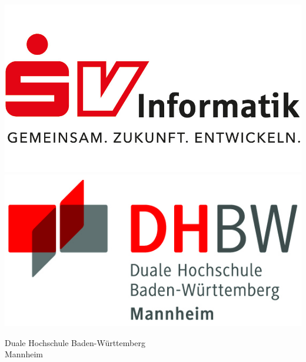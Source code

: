 \begin{titlepage}
	\begin{minipage}{\textwidth}
		\vspace{-2cm}
		\noindent \includegraphics[scale=0.71]{resource/SV-Inforamtik-Logo.jpg} \hfill   \includegraphics{resource/DHBW-Logo.jpg}
	\end{minipage}
	\vspace{1em}
	\sffamily
	\begin{center}
		\textsf{\large{}Duale Hochschule Baden-W\"urttemberg\\[1.5mm] Mannheim}\\[2em]
		\textsf{\textbf{\Large{}\varKindOfDocument}}\\[3mm]
		\textsf{\textbf{\varTitle}} \\[1.5cm]
		\textsf{\textbf{\Large{}\varCourseName}\\[3mm] \textsf{\varFieldOfStudy}}
		
		\vspace{3em}
		\vfill
		
		\begin{minipage}{\textwidth}
			

\end{minipage}
\end{center}
\end{titlepage}
